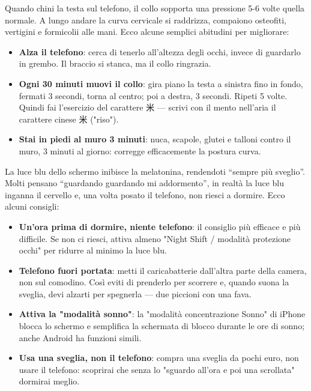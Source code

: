 
Quando chini la testa sul telefono, il collo sopporta una pressione 5-6 volte quella normale. A lungo andare la curva cervicale si raddrizza, compaiono osteofiti, vertigini e formicolii alle mani. Ecco alcune semplici abitudini per migliorare:

\begin{itemize}
  \item \textbf{Alza il telefono}: cerca di tenerlo all'altezza degli occhi, invece di guardarlo in grembo. Il braccio si stanca, ma il collo ringrazia.
  \item \textbf{Ogni 30 minuti muovi il collo}: gira piano la testa a sinistra fino in fondo, fermati 3 secondi, torna al centro; poi a destra, 3 secondi. Ripeti 5 volte. Quindi fai l'esercizio del carattere 米 — scrivi con il mento nell'aria il carattere cinese 米 ("riso").
  \item \textbf{Stai in piedi al muro 3 minuti}: nuca, scapole, glutei e talloni contro il muro, 3 minuti al giorno: corregge efficacemente la postura curva.
\end{itemize}


La luce blu dello schermo inibisce la melatonina, rendendoti “sempre più sveglio”. Molti pensano “guardando guardando mi addormento”, in realtà la luce blu inganna il cervello e, una volta posato il telefono, non riesci a dormire. Ecco alcuni consigli:

\begin{itemize}
  \item \textbf{Un'ora prima di dormire, niente telefono}: il consiglio più efficace e più difficile. Se non ci riesci, attiva almeno "Night Shift / modalità protezione occhi" per ridurre al minimo la luce blu.
  \item \textbf{Telefono fuori portata}: metti il caricabatterie dall'altra parte della camera, non sul comodino. Così eviti di prenderlo per scorrere e, quando suona la sveglia, devi alzarti per spegnerla — due piccioni con una fava.
  \item \textbf{Attiva la "modalità sonno"}: la "modalità concentrazione Sonno" di iPhone blocca lo schermo e semplifica la schermata di blocco durante le ore di sonno; anche Android ha funzioni simili.
  \item \textbf{Usa una sveglia, non il telefono}: compra una sveglia da pochi euro, non usare il telefono: scoprirai che senza lo "sguardo all'ora e poi una scrollata" dormirai meglio.
\end{itemize}

